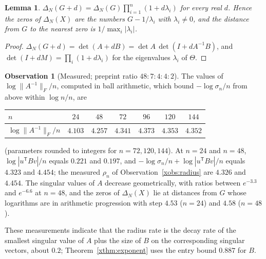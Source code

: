 \documentclass[11pt]{article}
\newtheorem{lemma}[theorem]{Lemma}
\theoremstyle{definition}
\newtheorem{observation}[theorem]{Observation}
\begin{document}
\begin{lemma}\label{xlem:zeros}
$\Delta_N(G+d)=\Delta_N(G)\prod_{i=1}^n(1+d\lambda_i)$ for every real $d$. Hence the zeros of $\Delta_N(X)$ are the numbers $G-1/\lambda_i$ with $\lambda_i\ne0$, and the distance from $G$ to the nearest zero is $1/\max_i|\lambda_i|$.
\end{lemma}

\begin{proof}
$\Delta_N(G+d)=\det(A+dB)=\det A\,\det(I+dA^{-1}B)$, and $\det(I+dM)=\prod_i(1+d\lambda_i)$ for the eigenvalues $\lambda_i$ of $\Theta$.
\end{proof}

\begin{observation}[Measured; preprint ratio $48:7:4:4:2$]\label{xobs:smin}
The values of $\log\|A^{-1}\|_F/n$, computed in ball arithmetic, which bound $-\log\sigma_n/n$ from above within $\log n/n$, are
\begin{center}
\begin{tabular}{lcccccc}
\toprule
$n$ & $24$ & $48$ & $72$ & $96$ & $120$ & $144$\\
\midrule
$\log\|A^{-1}\|_F/n$ & $4.103$ & $4.257$ & $4.341$ & $4.373$ & $4.353$ & $4.352$\\
\bottomrule
\end{tabular}
\end{center}
(parameters rounded to integers for $n=72,120,144$). At $n=24$ and $n=48$, $\log|u^{\mathsf T}Bv|/n$ equals $0.221$ and $0.197$, and $-\log\sigma_n/n+\log|u^{\mathsf T}Bv|/n$ equals $4.323$ and $4.454$; the measured $\rho_n$ of Observation~\ref{xobs:radius} are $4.326$ and $4.454$. The singular values of $A$ decrease geometrically, with ratios between $e^{-3.3}$ and $e^{-6.6}$ at $n=48$, and the zeros of $\Delta_N(X)$ lie at distances from $G$ whose logarithms are in arithmetic progression with step $4.53$ ($n=24$) and $4.58$ ($n=48$).
\end{observation}

These measurements indicate that the radius rate is the decay rate of the smallest singular value of $A$ plus the size of $B$ on the corresponding singular vectors, about $0.2$; Theorem~\ref{xthm:exponent} uses the entry bound $0.887$ for $B$.
\end{document}
